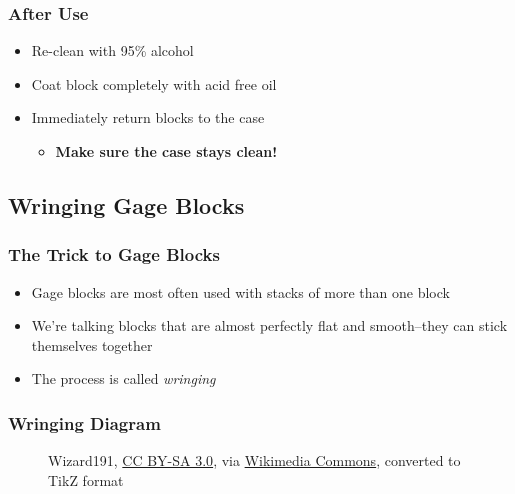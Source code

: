 \begin{frame}
	\frametitle{After Use}

    \begin{itemize}[<+- | alert@+>]
        \item Re-clean with 95\% alcohol
        \item Coat block completely with acid free oil
        \item Immediately return blocks to the case
            \begin{itemize}
                \item \textbf{Make sure the case stays clean!}
            \end{itemize}
    \end{itemize}
\end{frame}

\subsection{Wringing Gage Blocks}

\begin{frame}
	\frametitle{The Trick to Gage Blocks}

    \begin{itemize}[<+- | alert@+>]
        \item Gage blocks are most often used with stacks of more than one block
        \item We're talking blocks that are almost perfectly flat and smooth--they can stick themselves together
        \item The process is called \emph{wringing}
    \end{itemize}
\end{frame}

\begin{frame}
	\frametitle{Wringing Diagram}

    \begin{figure}
        \centering
        \resizebox{\linewidth}{!}{
            
        }

        \vspace{0.5em}
        {\tiny Wizard191, \href{http://creativecommons.org/licenses/by-sa/3.0/}{CC BY-SA 3.0}, via \href{https://commons.wikimedia.org/wiki/File:Gauge_block_wringing.svg}{Wikimedia Commons}, converted to TikZ format\par}
    \end{figure}
\end{frame}

